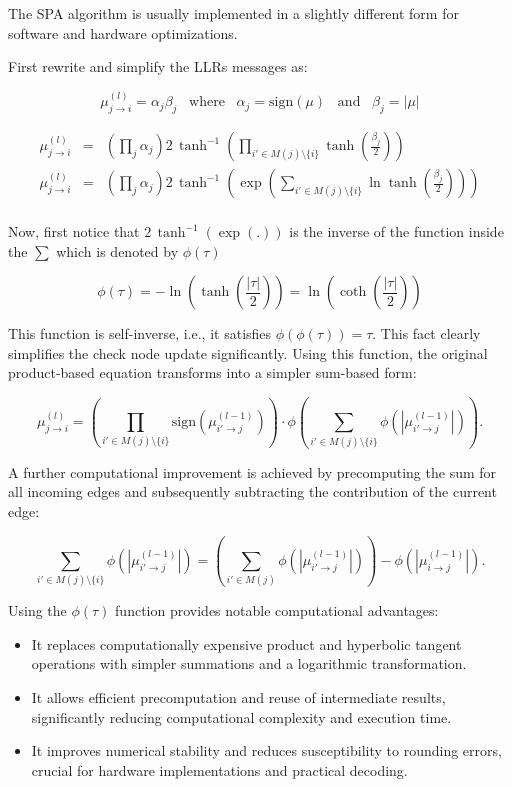 The SPA algorithm is usually implemented in a slightly different form for software and hardware optimizations.

First rewrite  and simplify the LLRs messages as:

\begin{equation}
	\mu_{j \rightarrow i}^{(l)} = \alpha_j\beta_j \;\;\; \text{where}\;\;\;  \alpha_j = \text{sign}(\mu) \;\;\; \text{and}\;\;\;  \beta_j = |\mu|
\end{equation}

\begin{eqnarray}
	\mu_{j \rightarrow i}^{(l)} &=& (\prod_j \alpha_j) 2\,\tanh^{-1}\left(\prod_{i' \in M(j)\setminus\{i\}}\tanh\left(\frac{\beta_j}{2}\right)\right) \nonumber \\
	\mu_{j \rightarrow i}^{(l)} &=& (\prod_j \alpha_j) 2\,\tanh^{-1}\left(\exp\left(\sum_{i' \in M(j)\setminus\{i\}}\ln\tanh\left(\frac{\beta_j}{2}\right)\right)\right) \nonumber \\
\end{eqnarray}

Now, first notice that $2\,\tanh^{-1}(\exp(.))$ is the inverse of the function inside the $\sum$ which is denoted by $\phi(\tau)$ 

\[
\phi(\tau) = -\ln\left(\tanh\left(\frac{|\tau|}{2}\right)\right) = \ln\left(\coth\left(\frac{|\tau|}{2}\right)\right)
\]

This function is self-inverse, i.e., it satisfies \(\phi(\phi(\tau)) = \tau\).
This fact clearly simplifies the check node update significantly. Using this function, the original product-based equation transforms into a simpler sum-based form:

\[
\mu_{j \rightarrow i}^{(l)} = \left(\prod_{i' \in M(j)\setminus\{i\}} \text{sign}(\mu_{i' \rightarrow j}^{(l-1)})\right) 
\cdot \phi\left(\sum_{i' \in M(j)\setminus\{i\}} \phi\left(|\mu_{i' \rightarrow j}^{(l-1)}|\right)\right).
\]

A further computational improvement is achieved by precomputing the sum for all incoming edges and subsequently subtracting the contribution of the current edge:

\[
\sum_{i' \in M(j)\setminus\{i\}} \phi(|\mu_{i' \rightarrow j}^{(l-1)}|) 
= \left(\sum_{i' \in M(j)} \phi(|\mu_{i' \rightarrow j}^{(l-1)}|)\right) - \phi(|\mu_{i \rightarrow j}^{(l-1)}|).
\]

Using the \(\phi(\tau)\) function provides notable computational advantages:

\begin{itemize}
    \item It replaces computationally expensive product and hyperbolic tangent operations with simpler summations and a logarithmic transformation.
    \item It allows efficient precomputation and reuse of intermediate results, significantly reducing computational complexity and execution time.
    \item It improves numerical stability and reduces susceptibility to rounding errors, crucial for hardware implementations and practical decoding.
\end{itemize}


